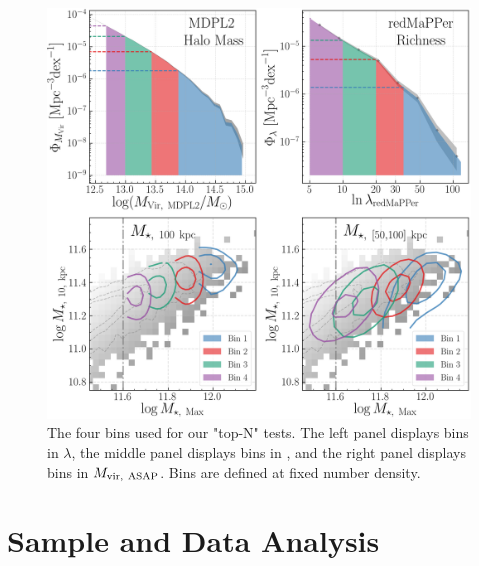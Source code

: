 \documentclass[fleqn,usenatbib,useAMS,english]{mnras}
\begin{document}
  \begin{figure}
      \centering
      \includegraphics[width=\textwidth]{figure/topn_bins}
      \caption{The four bins used for our "top-N" tests. The left panel displays bins in
          $\lambda$, the middle panel displays bins in \mmax{}, and the right panel displays bins
          in $M_{\rm vir,\ ASAP}$. Bins are defined at fixed number density. }
      \label{fig:density_bins}
  \end{figure}

\section{Sample and Data Analysis}
    \label{sec:data}
    
\end{document}
